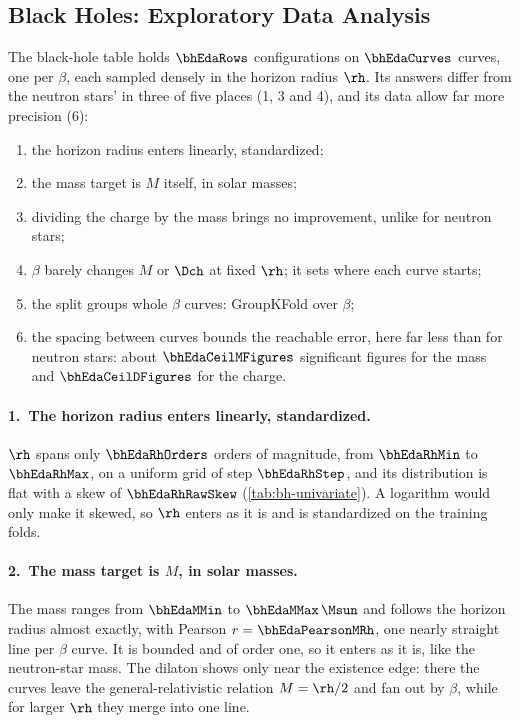 \subsection{Black Holes: Exploratory Data Analysis}
\label{sec:eda-bh}

The black-hole table holds $\bhEdaRows$ configurations on $\bhEdaCurves$ curves, one per $\beta$, each sampled densely in the horizon radius $\rh$. Its answers differ from the neutron stars' in three of five places (1, 3 and 4), and its data allow far more precision (6):
\begin{enumerate}
  \item the horizon radius enters linearly, standardized;
  \item the mass target is $M$ itself, in solar masses;
  \item dividing the charge by the mass brings no improvement, unlike for neutron stars;
  \item $\beta$ barely changes $M$ or $\Dch$ at fixed $\rh$; it sets where each curve starts;
  \item the split groups whole $\beta$ curves: GroupKFold over $\beta$;
  \item the spacing between curves bounds the reachable error, here far less than for neutron stars: about $\bhEdaCeilMFigures$ significant figures for the mass and $\bhEdaCeilDFigures$ for the charge.
\end{enumerate}

\paragraph{1.\ The horizon radius enters linearly, standardized.}
$\rh$ spans only $\bhEdaRhOrders$ orders of magnitude, from $\bhEdaRhMin$ to $\bhEdaRhMax$, on a uniform grid of step $\bhEdaRhStep$, and its distribution is flat with a skew of $\bhEdaRhRawSkew$ (\cref{tab:bh-univariate}). A logarithm would only make it skewed, so $\rh$ enters as it is and is standardized on the training folds.

\FloatBarrier

\paragraph{2.\ The mass target is $M$, in solar masses.}
The mass ranges from $\bhEdaMMin$ to $\bhEdaMMax\,\Msun$ and follows the horizon radius almost exactly, with Pearson $r = \bhEdaPearsonMRh$, one nearly straight line per $\beta$ curve. It is bounded and of order one, so it enters as it is, like the neutron-star mass. The dilaton shows only near the existence edge: there the curves leave the general-relativistic relation $M = \rh/2$ and fan out by $\beta$, while for larger $\rh$ they merge into one line.

